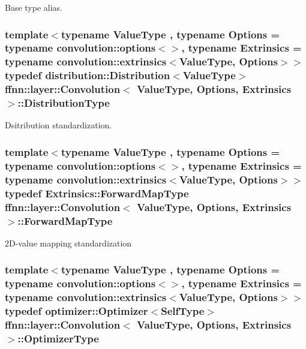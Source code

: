 Base type alias. 

\hypertarget{classffnn_1_1layer_1_1_convolution_a9c7844d7a6397adba38599846f7ba75c}{
\subsubsection[{Distribution\-Type}]{\setlength{\rightskip}{0pt plus 5cm}template$<$typename Value\-Type , typename Options  = typename convolution\-::options$<$$>$, typename Extrinsics  = typename convolution\-::extrinsics$<$\-Value\-Type, Options$>$$>$ typedef {\bf distribution\-::\-Distribution}$<$Value\-Type$>$ {\bf ffnn\-::layer\-::\-Convolution}$<$ Value\-Type, Options, Extrinsics $>$\-::{\bf Distribution\-Type}}}\label{classffnn_1_1layer_1_1_convolution_a9c7844d7a6397adba38599846f7ba75c}


Dsitribution standardization. 

\hypertarget{classffnn_1_1layer_1_1_convolution_a5042d4aa0d40a1f1b719340eb5e62edc}{
\subsubsection[{Forward\-Map\-Type}]{\setlength{\rightskip}{0pt plus 5cm}template$<$typename Value\-Type , typename Options  = typename convolution\-::options$<$$>$, typename Extrinsics  = typename convolution\-::extrinsics$<$\-Value\-Type, Options$>$$>$ typedef Extrinsics\-::\-Forward\-Map\-Type {\bf ffnn\-::layer\-::\-Convolution}$<$ Value\-Type, Options, Extrinsics $>$\-::{\bf Forward\-Map\-Type}}}\label{classffnn_1_1layer_1_1_convolution_a5042d4aa0d40a1f1b719340eb5e62edc}


2\-D-\/value mapping standardization 

\hypertarget{classffnn_1_1layer_1_1_convolution_a2daee819da77dc38cb3861397a02903c}{
\subsubsection[{Optimizer\-Type}]{\setlength{\rightskip}{0pt plus 5cm}template$<$typename Value\-Type , typename Options  = typename convolution\-::options$<$$>$, typename Extrinsics  = typename convolution\-::extrinsics$<$\-Value\-Type, Options$>$$>$ typedef {\bf optimizer\-::\-Optimizer}$<${\bf Self\-Type}$>$ {\bf ffnn\-::layer\-::\-Convolution}$<$ Value\-Type, Options, Extrinsics $>$\-::{\bf Optimizer\-Type}}}\label{classffnn_1_1layer_1_1_convolution_a2daee819da77dc38cb3861397a02903c}


